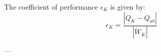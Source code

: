 The coefficient of performance \( \epsilon_K \) is given by:  
\[
\epsilon_K = \frac{\left| \dot{Q}_K - \dot{Q}_{ab} \right|}{\left| \dot{W}_K \right|}
\]

---